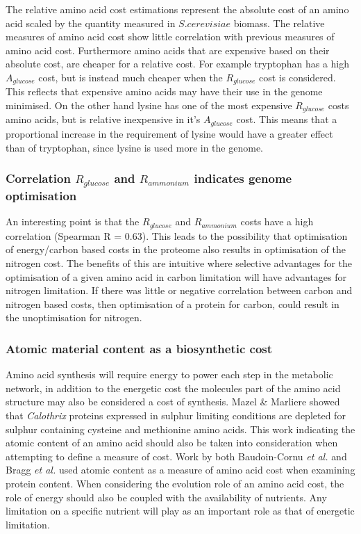 The relative amino acid cost estimations represent the absolute cost of an amino acid scaled by the quantity measured in $S. cerevisiae$ biomass. The relative measures of amino acid cost show little correlation with previous measures of amino acid cost. Furthermore amino acids that are expensive based on their absolute cost, are cheaper for a relative cost. For example tryptophan has a high $A_{glucose}$ cost, but is instead much cheaper when the $R_{glucose}$ cost is considered. This reflects that expensive amino acids may have their use in the genome minimised. On the other hand lysine has one of the most expensive $R_{glucose}$ costs amino acids, but is relative inexpensive in it's $A_{glucose}$ cost. This means that a proportional increase in the requirement of lysine would have a greater effect than of tryptophan, since lysine is used more in the genome.

\subsubsection{Correlation $R_{glucose}$ and $R_{ammonium}$ indicates genome optimisation}

An interesting point is that the $R_{glucose}$ and $R_{ammonium}$ costs have a high correlation (Spearman R = 0.63). This leads to the possibility that optimisation of energy/carbon based costs in the proteome also results in optimisation of the nitrogen cost. The benefits of this are intuitive where selective advantages for the optimisation of a given amino acid in carbon limitation will have advantages for nitrogen limitation. If there was little or negative correlation between carbon and nitrogen based costs, then optimisation of a protein for carbon, could result in the unoptimisation for nitrogen.

\subsubsection{Atomic material content as a biosynthetic cost}

Amino acid synthesis will require energy to power each step in the metabolic network, in addition to the energetic cost the molecules part of the amino acid structure may also be considered a cost of synthesis. Mazel \& Marliere \cite{mazel1989} showed that \emph{Calothrix} proteins expressed in sulphur limiting conditions are depleted for sulphur containing cysteine and methionine amino acids. This work indicating the atomic content of an amino acid should also be taken into consideration when attempting to define a measure of cost. Work by both Baudoin-Cornu \emph{et al.} \cite{baudoin2001} and Bragg \emph{et al.}	\cite{bragg2006} used atomic content as a measure of amino acid cost when examining protein content. When considering the evolution role of an amino acid cost, the role of energy should also be coupled with the availability of nutrients. Any limitation on a specific nutrient will play as an important role as that of energetic limitation.

